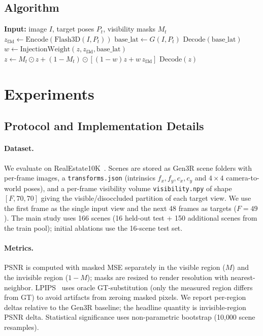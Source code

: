 \documentclass[10pt,twocolumn,letterpaper]{article}
\begin{document}
\subsection{Algorithm}
\begin{algorithm}[t]
\caption{Selective geometry-guided generation}
\label{alg:main}
\begin{algorithmic}[1]
\State \textbf{Input:} image $I$, target poses $P_t$, visibility masks $M_t$
\State $z_{\text{f3d}} \gets \text{Encode}(\text{Flash3D}(I, P_t))$
\State $\text{base\_lat} \gets G(I, P_t)$ 
  \State \Return $\text{Decode}(\text{base\_lat})$ 
\EndIf
{}
  \State $w \gets \text{InjectionWeight}(z, z_{\text{f3d}}, \text{base\_lat})$
  \State $z \gets M_t\odot z + (1-M_t)\odot[(1-w)z + w\,z_{\text{f3d}}]$
\EndFor
\State \Return $\text{Decode}(z)$
\end{algorithmic}
\end{algorithm}

\section{Experiments}
\label{sec:exp}

\subsection{Protocol and Implementation Details}
\label{sec:protocol}
\paragraph{Dataset.} We evaluate on RealEstate10K~\cite{realestate10k}. Scenes
are stored as Gen3R scene folders with per-frame images, a
\texttt{transforms.json} (intrinsics $f_x,f_y,c_x,c_y$ and $4{\times}4$
camera-to-world poses), and a per-frame visibility volume
\texttt{visibility.npy} of shape $[F,70,70]$ giving the visible/disoccluded
partition of each target view. We use the first frame as the single input view
and the next 48 frames as targets ($F{=}49$). The main study uses 166 scenes
(16 held-out test + 150 additional scenes from the train pool); initial
ablations use the 16-scene test set.

\paragraph{Metrics.} PSNR is computed with masked MSE separately in the visible
region ($M$) and the invisible region ($1{-}M$); masks are resized to render
resolution with nearest-neighbor. LPIPS~\cite{lpips} uses oracle GT-substitution
(only the measured region differs from GT) to avoid artifacts from zeroing
masked pixels. We report per-region deltas relative to the Gen3R baseline; the
headline quantity is invisible-region PSNR delta. Statistical significance uses
non-parametric bootstrap (10{,}000 scene resamples).
\end{document}
